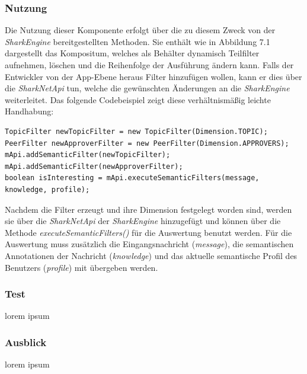 \subsubsection{Nutzung}
Die Nutzung dieser Komponente erfolgt über die zu diesem Zweck von der \textit{SharkEngine} bereitgestellten Methoden. Sie enthält wie in Abbildung 7.1 dargestellt das Kompositum, welches als Behälter dynamisch Teilfilter aufnehmen, löschen und die Reihenfolge der Ausführung ändern kann. Falls der Entwickler von der App-Ebene heraus Filter hinzufügen wollen, kann er dies über die \textit{SharkNetApi} tun, welche die gewünschten Änderungen an die \textit{SharkEngine} weiterleitet. Das folgende Codebeispiel zeigt diese ver\-hält\-nis\-mä\-ßig leichte Handhabung:
 \lstset{language=Java, caption=Beispiel für die Anwendung der Filter, label=DescriptiveLabel, numbers=left, numbersep=1em, breaklines=true, basicstyle=\small}
 \begin{lstlisting}
TopicFilter newTopicFilter = new TopicFilter(Dimension.TOPIC);
PeerFilter newApproverFilter = new PeerFilter(Dimension.APPROVERS);
mApi.addSemanticFilter(newTopicFilter);
mApi.addSemanticFilter(newApproverFilter);
boolean isInteresting = mApi.executeSemanticFilters(message, knowledge, profile);
 \end{lstlisting}
Nachdem die Filter erzeugt und ihre Dimension festgelegt worden sind, werden sie über die \textit{SharkNetApi} der \textit{SharkEngine} hinzugefügt und können über die Methode \textit{executeSemanticFilters()} für die Auswertung benutzt werden. Für die Auswertung muss zusätzlich die Eingangsnachricht (\textit{message}), die semantischen Annotationen der Nachricht (\textit{knowledge}) und das aktuelle semantische Profil des Benutzers (\textit{profile}) mit übergeben werden.



\subsubsection{Test}
lorem ipsum


\subsubsection{Ausblick}
lorem ipsum
\newpage